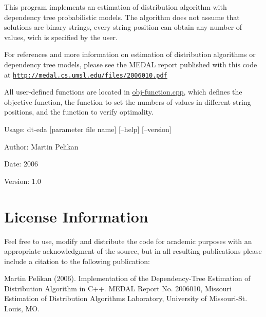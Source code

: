 This program implements an estimation of distribution algorithm with dependency tree probabilistic models. The algorithm does not assume that solutions are binary strings, every string position can obtain any number of values, wich is specified by the user.

For references and more information on estimation of distribution algorithms or dependency tree models, please see the MEDAL report published with this code at \href{http://medal.cs.umsl.edu/files/2006010.pdf}\tt{http://medal.cs.umsl.edu/files/2006010.pdf}

All user-defined functions are located in \hyperlink{obj-function_8cpp}{obj-function.cpp}, which defines the objective function, the function to set the numbers of values in different string positions, and the function to verify optimality.

Usage: dt-eda \mbox{[}parameter file name\mbox{]} \mbox{[}--help\mbox{]} \mbox{[}--version\mbox{]}

\begin{Desc}
\item[Author:]Martin Pelikan\end{Desc}
\begin{Desc}
\item[Date:]2006\end{Desc}
\begin{Desc}
\item[Version:]1.0\end{Desc}
\hypertarget{index_license}{}\section{License Information}\label{index_license}
Feel free to use, modify and distribute the code for academic purposes with an appropriate acknowledgment of the source, but in all resulting publications please include a citation to the following publication:

Martin Pelikan (2006). Implementation of the Dependency-Tree Estimation of Distribution Algorithm in C++. MEDAL Report No. 2006010, Missouri Estimation of Distribution Algorithms Laboratory, University of Missouri-St. Louis, MO. 